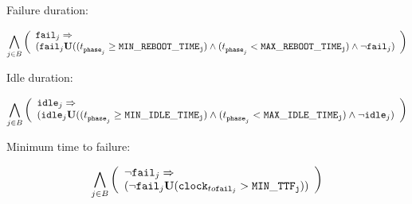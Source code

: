 Failure duration:

\begin{align*}
%
\bigwedge_{
	\begin{subarray}{c}
	j \in B\\
	\end{subarray}
}
\left( \begin{array}{l}
\f{j} \Rightarrow \\
(\f{j}  \U (( \tph{j}{} \geq \mathtt{MIN\_REBOOT\_TIME_j}) \land ( \tph{j}{} < \mathtt{MAX\_REBOOT\_TIME_j}) \land \lnot \f{j})
\end{array} \right)\\ 
%
%
\end{align*}

Idle duration:

\begin{align*}
%
\bigwedge_{
	\begin{subarray}{c}
	j \in B\\
	\end{subarray}
}
\left( \begin{array}{l}
\id{j}  \Rightarrow \\
(\id{j}  \U (( \tph{j}{} \geq \mathtt{MIN\_IDLE\_TIME_j}) \land ( \tph{j}{} < \mathtt{MAX\_IDLE\_TIME_j}) \land \lnot \id{j})
\end{array} \right)\\ 
%
%
\end{align*}

Minimum time to failure:

\begin{align*}
%
\bigwedge_{
	\begin{subarray}{c}
	j \in B\\
	\end{subarray}
}
\left( \begin{array}{l}
\lnot \f{j} \Rightarrow \\
(\lnot \f{j}  \U ( \cltf{j} > \mathtt{MIN\_TTF_j}))
\end{array} \right)\\ 
%
%
\end{align*}





